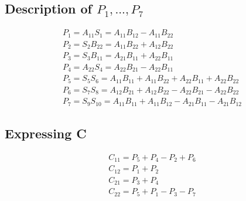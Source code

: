 \documentclass{article}[18pt]
\begin{document}
\subsection{Description of $P_1,...,P_7$}
\[
\begin{array}{l}{P_{1}=A_{11} S_{1}=A_{11} B_{12}-A_{11} B_{22}} \\ {P_{2}=S_{2} B_{22}=A_{11} B_{22}+A_{12} B_{22}} \\ {P_{3}=S_{3} B_{11}=A_{21} B_{11}+A_{22} B_{11}} \\ {P_{4}=A_{22} S_{4}=A_{22} B_{21}-A_{22} B_{11}} \\ {P_{5}=S_{5} S_{6}=A_{11} B_{11}+A_{11} B_{22}+A_{22} B_{11}+A_{22} B_{22}} \\ {P_{6}=S_{7} S_{8}=A_{12} B_{21}+A_{12} B_{22}-A_{22} B_{21}-A_{22} B_{22}} \\ {P_{7}=S_{9} S_{10}=A_{11} B_{11}+A_{11} B_{12}-A_{21} B_{11}-A_{21} B_{12}}\end{array}
\]
\subsection{Expressing C}
\[
\begin{array}{l}{C_{11}=P_{5}+P_{4}-P_{2}+P_{6}} \\ {C_{12}=P_{1}+P_{2}} \\ {C_{21}=P_{3}+P_{4}} \\ {C_{22}=P_{5}+P_{1}-P_{3}-P_{7}}\end{array}
\]
\end{document}
